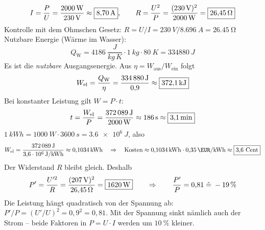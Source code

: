 \documentclass[11pt,a4paper]{article}
\begin{document}
\begin{loesung}
\[
  I = \frac{P}{U} = \frac{\SI{2000}{W}}{\SI{230}{V}} \approx \boxed{\SI{8.70}{A}}, \qquad
  R = \frac{U^2}{P} = \frac{(\SI{230}{V})^2}{\SI{2000}{W}} = \boxed{\SI{26.45}{\ohm}}
\]
Kontrolle mit dem Ohmschen Gesetz: $R = U/I = \SI{230}{V}/\SI{8.696}{A} = \SI{26.45}{\ohm}$ \checkmark
{}
Nutzbare Energie (Wärme im Wasser):
\[
  Q_\text{W} = \SI{4186}{\frac{J}{kg\,K}} \cdot \SI{1}{kg}\cdot \SI{80}{K} = \SI{334880}{J}
\]
Es ist die \emph{nutzbare} Ausgangsenergie. Aus $\eta = W_\text{aus}/W_\text{ein}$ folgt
\[
  W_\text{el} = \frac{Q_\text{W}}{\eta} = \frac{\SI{334880}{J}}{0{,}9} \approx \boxed{\SI{372.1}{kJ}}
\]
Bei konstanter Leistung gilt $W = P\cdot t$:
\[
  t = \frac{W_\text{el}}{P} = \frac{\SI{372089}{J}}{\SI{2000}{W}} \approx \SI{186}{s} \approx \boxed{\SI{3.1}{min}}
\]
$\SI{1}{kWh} = \SI{1000}{W}\cdot\SI{3600}{s} = \SI{3.6e6}{J}$, also
\[
  W_\text{el} = \frac{\SI{372089}{J}}{\SI{3.6e6}{J/kWh}} \approx \SI{0.1034}{kWh}
  \quad\Rightarrow\quad \text{Kosten} \approx \SI{0.1034}{kWh}\cdot\SI{0.35}{\EUR/kWh} \approx \ergebnis{3{,}6\ \text{Cent}}
\]
Der Widerstand $R$ bleibt gleich. Deshalb
\[
  P' = \frac{U'^2}{R} = \frac{(\SI{207}{V})^2}{\SI{26.45}{\ohm}} = \boxed{\SI{1620}{W}}
  \qquad\Rightarrow\qquad \frac{P'}{P} = 0{,}81 \;\hat{=}\; \SI{-19}{\percent}
\]
Die Leistung hängt quadratisch von der Spannung ab: $P'/P = (U'/U)^2 = 0{,}9^2 = 0{,}81$. Mit der Spannung sinkt nämlich auch der Strom -- beide Faktoren in $P = U\cdot I$ werden um $\SI{10}{\percent}$ kleiner.
\end{loesung}
\end{document}
